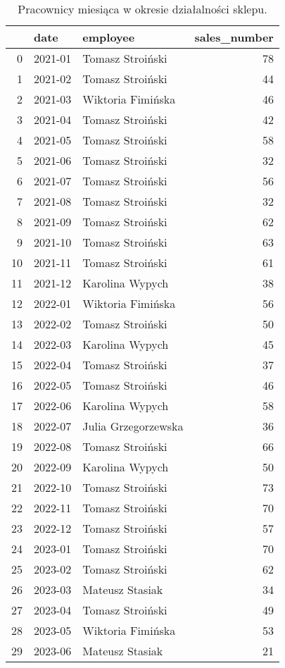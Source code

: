 \begin{table}[h]
\centering
\caption{Pracownicy miesiąca w okresie działalności sklepu.}\label{tab:tab1}
\begin{tabular}{rllr}
\hline
    & date    & employee            &   sales\_number \\
\hline
  0 & 2021-01 & Tomasz Stroiński    &             78 \\
  1 & 2021-02 & Tomasz Stroiński    &             44 \\
  2 & 2021-03 & Wiktoria Fimińska   &             46 \\
  3 & 2021-04 & Tomasz Stroiński    &             42 \\
  4 & 2021-05 & Tomasz Stroiński    &             58 \\
  5 & 2021-06 & Tomasz Stroiński    &             32 \\
  6 & 2021-07 & Tomasz Stroiński    &             56 \\
  7 & 2021-08 & Tomasz Stroiński    &             32 \\
  8 & 2021-09 & Tomasz Stroiński    &             62 \\
  9 & 2021-10 & Tomasz Stroiński    &             63 \\
 10 & 2021-11 & Tomasz Stroiński    &             61 \\
 11 & 2021-12 & Karolina Wypych     &             38 \\
 12 & 2022-01 & Wiktoria Fimińska   &             56 \\
 13 & 2022-02 & Tomasz Stroiński    &             50 \\
 14 & 2022-03 & Karolina Wypych     &             45 \\
 15 & 2022-04 & Tomasz Stroiński    &             37 \\
 16 & 2022-05 & Tomasz Stroiński    &             46 \\
 17 & 2022-06 & Karolina Wypych     &             58 \\
 18 & 2022-07 & Julia Grzegorzewska &             36 \\
 19 & 2022-08 & Tomasz Stroiński    &             66 \\
 20 & 2022-09 & Karolina Wypych     &             50 \\
 21 & 2022-10 & Tomasz Stroiński    &             73 \\
 22 & 2022-11 & Tomasz Stroiński    &             70 \\
 23 & 2022-12 & Tomasz Stroiński    &             57 \\
 24 & 2023-01 & Tomasz Stroiński    &             70 \\
 25 & 2023-02 & Tomasz Stroiński    &             62 \\
 26 & 2023-03 & Mateusz Stasiak     &             34 \\
 27 & 2023-04 & Tomasz Stroiński    &             49 \\
 28 & 2023-05 & Wiktoria Fimińska   &             53 \\
 29 & 2023-06 & Mateusz Stasiak     &             21 \\
\hline
\end{tabular}\end{table}